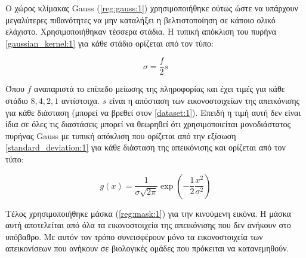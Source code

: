 \documentclass[a4paper,12pt]{article}
\begin{document}
Ο χώρος κλίμακας Gauss (\ref{reg:gauss:1}) χρησιμοποιήθηκε ούτως ώστε να
υπάρχουν μεγαλύτερες πιθανότητες να μην καταλήξει η βελτιστοποίηση σε κάποιο
ολικό ελάχιστο. Χρησιμοποιήθηκαν τέσσερα στάδια. Η τυπική απόκλιση του πυρήνα
\eqref{gaussian_kernel:1} για κάθε στάδιο ορίζεται από τον τύπο:

\begin{equation} \label{standard_deviation:1}
    \sigma = \frac {f} {2} s
\end{equation}

Όπου $f$ αναπαριστά το επίπεδο μείωσης της πληροφορίας και έχει τιμές για κάθε
στάδιο $8,4,2,1$ αντίστοιχα. $s$ είναι η απόσταση των εικονοστοιχείων της
απεικόνισης για κάθε διάσταση (μπορεί να βρεθεί στον \autoref{dataset:1}).
Επειδή η τιμή αυτή δεν είναι ίδια σε όλες τις διαστάσεις μπορεί να θεωρηθεί ότι
χρησιμοποιείται μονοδιάστατος πυρήνας Gauss με τυπική απόκλιση που ορίζεται από
την εξίσωση \eqref{standard_deviation:1} για κάθε διάσταση της απεικόνισης και
ορίζεται από τον τύπο:

\begin{equation*}
    g(x) = \frac {1} {\sigma\sqrt{2\pi}} \exp{\left( -\frac{1}{2}
           \frac {x^2} {\sigma^2} \right)}
\end{equation*}

Τέλος χρησιμοποιήθηκε μάσκα (\ref{reg:mask:1}) για την κινούμενη εικόνα. Η μάσκα
αυτή αποτελείται από όλα τα εικονοστοιχεία της απεικόνισης που δεν ανήκουν στο
υπόβαθρο. Με αυτόν τον τρόπο συνεισφέρουν μόνο τα εικονοστοιχεία των
απεικονίσεων που ανήκουν σε βιολογικές ομάδες που πρόκειται να κατανεμηθούν.




\newpage

\printbibliography
\end{document}
